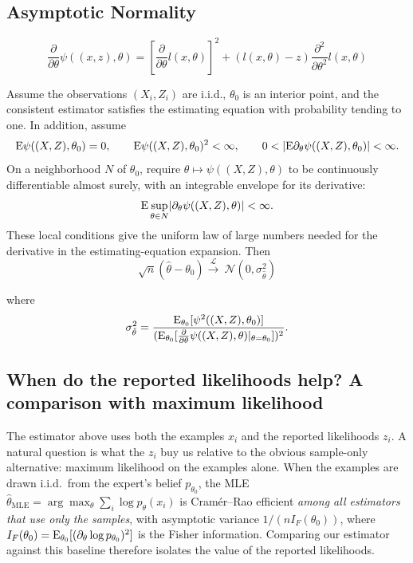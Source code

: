 \subsection{Asymptotic Normality}

$$\frac{\partial}{\partial \theta} \psi((x,z),\theta) = \left[ \frac{\partial}{\partial \theta}l(x,\theta) \right]^2  + (l(x,\theta)-z) \frac{\partial^2}{\partial \theta^2}l(x,\theta)$$

Assume the observations $(X_i,Z_i)$ are i.i.d., $\theta_0$ is an interior point, and the consistent estimator satisfies the estimating equation with probability tending to one. In addition, assume
\[
\mathrm{E}\psi((X,Z),\theta_0)=0,\qquad
\mathrm{E}\psi((X,Z),\theta_0)^2<\infty,\qquad
0<\lvert\mathrm{E}\partial_\theta\psi((X,Z),\theta_0)\rvert<\infty.
\]
On a neighborhood $N$ of $\theta_0$, require $\theta\mapsto\psi((X,Z),\theta)$ to be continuously differentiable almost surely, with an integrable envelope for its derivative:
\[
\mathrm{E}\sup_{\theta\in N}\lvert\partial_\theta\psi((X,Z),\theta)\rvert<\infty.
\]
These local conditions give the uniform law of large numbers needed for the derivative in the estimating-equation expansion. Then $$\sqrt{n}(\hat{\theta}-\theta_0) \xrightarrow{\mathcal{L}}\ \mathcal{N}(0,\sigma_{\hat{\theta}}^2)$$

where $$\sigma_{\hat{\theta}}^2 = \frac{\mathrm{E}_{\theta_0}[\psi^2((X,Z),\theta_0)]}{(\mathrm{E}_{\theta_0} [\frac{\partial}{\partial \theta} \psi((X,Z),\theta)|_{\theta=\theta_0}])^2}.$$

\subsection{When do the reported likelihoods help? A comparison with maximum likelihood}
\label{sec:ls-vs-mle}

The estimator above uses both the examples $x_i$ and the reported likelihoods $z_i$. A natural question is what the $z_i$ buy us relative to the obvious sample-only alternative: maximum likelihood on the examples alone. When the examples are drawn i.i.d.\ from the expert's belief $p_{\theta_0}$, the MLE $\hat{\theta}_{\mathrm{MLE}}=\arg\max_\theta \sum_i \log p_\theta(x_i)$ is Cram\'er--Rao efficient \emph{among all estimators that use only the samples}, with asymptotic variance $1/(nI_F(\theta_0))$, where $I_F(\theta_0)=\mathrm{E}_{\theta_0}[(\partial_\theta \log p_{\theta_0})^2]$ is the Fisher information. Comparing our estimator against this baseline therefore isolates the value of the reported likelihoods.

